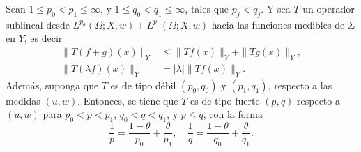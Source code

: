 \begin{theorem}
	Sean $1\leq p_0 < p_1 \leq \infty$, y $1\leq q_0 < q_1 \leq \infty$, tales que $p_j<q_j$. Y sea $T$ un operador sublineal desde $L^{p_0}(\Omega;X, w)+L^{p_1}(\Omega;X, w)$ hacia las funciones medibles de $\Sigma$ en $Y$, es decir 
	\begin{align*}
		\|T(f+g)(x)\|_Y & \leq \|Tf(x)\|_Y + \|Tg(x)\|_Y,\\
		\|T(\lambda f)(x)\|_Y &= |\lambda|\|Tf(x)\|_Y.
	\end{align*}
	Además, suponga que $T$ es de tipo débil $(p_0, q_0)$ y $(p_1, q_1)$, respecto a las medidas $(u, w)$. Entonces, se tiene que $T$ es de tipo fuerte $(p, q)$ respecto a $(u, w)$ para $p_0<p<p_1$, $q_0<q<q_1$, y $p\leq q$, con la forma 
	\begin{equation*}
		\frac{1}{p} = \frac{1-\theta}{p_0} + \frac{\theta}{p_1}, \quad \frac{1}{q} = \frac{1-\theta}{q_0} + \frac{\theta}{q_1}.
	\end{equation*}
\end{theorem}
